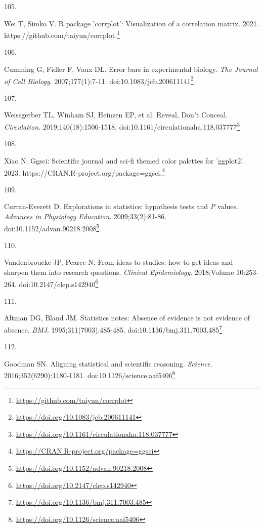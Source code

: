 \documentclass[
  a4paper,
]{book}
\newlength{\cslhangindent}
\newlength{\csllabelwidth}
\newlength{\cslentryspacingunit} %
\newenvironment{CSLReferences}[2] %
 {%
  \setlength{\parindent}{0pt}
  \ifodd #1
  \let\oldpar\par
  \def\par{\hangindent=\cslhangindent\oldpar}
  \fi
  \setlength{\parskip}{#2\cslentryspacingunit}
 }%
 {}
\newcommand{\CSLLeftMargin}[1]{\parbox[t]{\csllabelwidth}{#1}}
\newcommand{\CSLRightInline}[1]{\parbox[t]{\linewidth - \csllabelwidth}{#1}\break}
\renewcommand{\href}[2]{#2\footnote{\url{#1}}}
\begin{document}
\begin{CSLReferences}{0}{0}
\leavevmode{}%
\CSLLeftMargin{105. }%
\CSLRightInline{Wei T, Simko V. R package 'corrplot': Visualization of a correlation matrix. 2021. \href{https://github.com/taiyun/corrplot}{https://github.com/taiyun/corrplot.}}

\leavevmode{}%
\CSLLeftMargin{106. }%
\CSLRightInline{Cumming G, Fidler F, Vaux DL. Error bars in experimental biology. \emph{The Journal of Cell Biology}. 2007;177(1):7-11. doi:\href{https://doi.org/10.1083/jcb.200611141}{10.1083/jcb.200611141}}

\leavevmode{}%
\CSLLeftMargin{107. }%
\CSLRightInline{Weissgerber TL, Winham SJ, Heinzen EP, et al. Reveal, Don{'}t Conceal. \emph{Circulation}. 2019;140(18):1506-1518. doi:\href{https://doi.org/10.1161/circulationaha.118.037777}{10.1161/circulationaha.118.037777}}

\leavevmode{}%
\CSLLeftMargin{108. }%
\CSLRightInline{Xiao N. Ggsci: Scientific journal and sci-fi themed color palettes for 'ggplot2'. 2023. \href{https://CRAN.R-project.org/package=ggsci}{https://CRAN.R-project.org/package=ggsci.}}

\leavevmode{}%
\CSLLeftMargin{109. }%
\CSLRightInline{Curran-Everett D. Explorations in statistics: hypothesis tests and {\emph{P}} values. \emph{Advances in Physiology Education}. 2009;33(2):81-86. doi:\href{https://doi.org/10.1152/advan.90218.2008}{10.1152/advan.90218.2008}}

\leavevmode{}%
\CSLLeftMargin{110. }%
\CSLRightInline{Vandenbroucke JP, Pearce N. From ideas to studies: how to get ideas and sharpen them into research questions. \emph{Clinical Epidemiology}. 2018;Volume 10:253-264. doi:\href{https://doi.org/10.2147/clep.s142940}{10.2147/clep.s142940}}

\leavevmode{}%
\CSLLeftMargin{111. }%
\CSLRightInline{Altman DG, Bland JM. Statistics notes: Absence of evidence is not evidence of absence. \emph{BMJ}. 1995;311(7003):485-485. doi:\href{https://doi.org/10.1136/bmj.311.7003.485}{10.1136/bmj.311.7003.485}}

\leavevmode{}%
\CSLLeftMargin{112. }%
\CSLRightInline{Goodman SN. Aligning statistical and scientific reasoning. \emph{Science}. 2016;352(6290):1180-1181. doi:\href{https://doi.org/10.1126/science.aaf5406}{10.1126/science.aaf5406}}


\end{CSLReferences}
\end{document}
